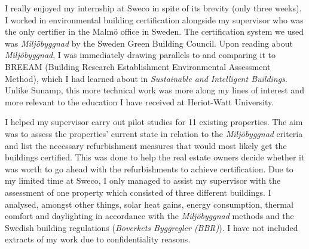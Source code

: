 I really enjoyed my internship at Sweco in spite of its brevity (only three weeks).
I worked in environmental building certification alongside my supervisor who was the only certifier in the Malm\"o office in Sweden.
The certification system we used was \textit{Milj\"obyggnad} by the Sweden Green Building Council.
Upon reading about \textit{Milj\"obyggnad}, I was immediately drawing parallels to and comparing it to BREEAM (Building Research Establishment Environmental Assessment Method), which I had learned about in \textit{Sustainable and Intelligent Buildings}.
Unlike Sunamp, this more technical work was more along my lines of interest and more relevant to the education I have received at Heriot-Watt University.

I helped my supervisor carry out pilot studies for 11 existing properties.
The aim was to assess the properties' current state in relation to the \textit{Milj\"obyggnad} criteria and list the necessary refurbishment measures that would most likely get the buildings certified.
This was done to help the real estate owners decide whether it was worth to go ahead with the refurbishments to achieve certification.
Due to my limited time at Sweco, I only managed to assist my supervisor with the assessment of one property which consisted of three different buildings.
I analysed, amongst other things, solar heat gains, energy consumption, thermal comfort and daylighting in accordance with the \textit{Milj\"obyggnad} methods and the Swedish building regulations (\textit{Boverkets Byggregler (BBR)}).
I have not included extracts of my work due to confidentiality reasons.


